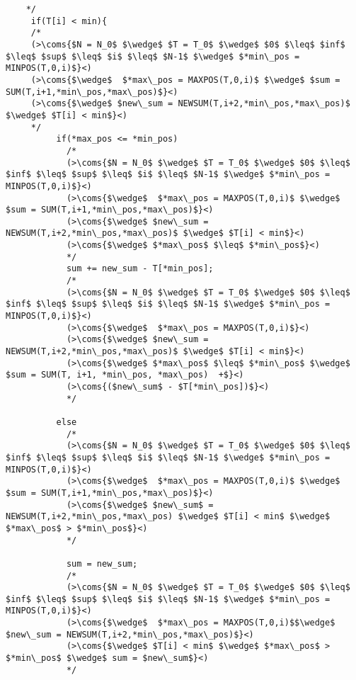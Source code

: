 \begin{lstlisting}
    */
     if(T[i] < min){
     /*
     (>\coms{$N = N_0$ $\wedge$ $T = T_0$ $\wedge$ $0$ $\leq$ $inf$ $\leq$ $sup$ $\leq$ $i$ $\leq$ $N-1$ $\wedge$ $*min\_pos = MINPOS(T,0,i)$}<)
     (>\coms{$\wedge$  $*max\_pos = MAXPOS(T,0,i)$ $\wedge$ $sum = SUM(T,i+1,*min\_pos,*max\_pos)$}<)
     (>\coms{$\wedge$ $new\_sum = NEWSUM(T,i+2,*min\_pos,*max\_pos)$ $\wedge$ $T[i] < min$}<)
     */
          if(*max_pos <= *min_pos)
            /*
            (>\coms{$N = N_0$ $\wedge$ $T = T_0$ $\wedge$ $0$ $\leq$ $inf$ $\leq$ $sup$ $\leq$ $i$ $\leq$ $N-1$ $\wedge$ $*min\_pos = MINPOS(T,0,i)$}<)
            (>\coms{$\wedge$  $*max\_pos = MAXPOS(T,0,i)$ $\wedge$ $sum = SUM(T,i+1,*min\_pos,*max\_pos)$}<)
            (>\coms{$\wedge$ $new\_sum = NEWSUM(T,i+2,*min\_pos,*max\_pos)$ $\wedge$ $T[i] < min$}<) 
            (>\coms{$\wedge$ $*max\_pos$ $\leq$ $*min\_pos$}<)
            */
            sum += new_sum - T[*min_pos];
            /*
            (>\coms{$N = N_0$ $\wedge$ $T = T_0$ $\wedge$ $0$ $\leq$ $inf$ $\leq$ $sup$ $\leq$ $i$ $\leq$ $N-1$ $\wedge$ $*min\_pos = MINPOS(T,0,i)$}<)
            (>\coms{$\wedge$  $*max\_pos = MAXPOS(T,0,i)$}<)
            (>\coms{$\wedge$ $new\_sum = NEWSUM(T,i+2,*min\_pos,*max\_pos)$ $\wedge$ $T[i] < min$}<) 
            (>\coms{$\wedge$ $*max\_pos$ $\leq$ $*min\_pos$ $\wedge$ $sum = SUM(T, i+1, *min\_pos, *max\_pos)  +$}<)
            (>\coms{($new\_sum$ - $T[*min\_pos])$}<)
            */

          else
            /*
            (>\coms{$N = N_0$ $\wedge$ $T = T_0$ $\wedge$ $0$ $\leq$ $inf$ $\leq$ $sup$ $\leq$ $i$ $\leq$ $N-1$ $\wedge$ $*min\_pos = MINPOS(T,0,i)$}<)
            (>\coms{$\wedge$  $*max\_pos = MAXPOS(T,0,i)$ $\wedge$ $sum = SUM(T,i+1,*min\_pos,*max\_pos)$}<)
            (>\coms{$\wedge$ $new\_sum$ = NEWSUM(T,i+2,*min\_pos,*max\_pos) $\wedge$ $T[i] < min$ $\wedge$ $*max\_pos$ > $*min\_pos$}<) 
            */
            
            sum = new_sum;
            /*
            (>\coms{$N = N_0$ $\wedge$ $T = T_0$ $\wedge$ $0$ $\leq$ $inf$ $\leq$ $sup$ $\leq$ $i$ $\leq$ $N-1$ $\wedge$ $*min\_pos = MINPOS(T,0,i)$}<)
            (>\coms{$\wedge$  $*max\_pos = MAXPOS(T,0,i)$$\wedge$ $new\_sum = NEWSUM(T,i+2,*min\_pos,*max\_pos)$}<)
            (>\coms{$\wedge$ $T[i] < min$ $\wedge$ $*max\_pos$ > $*min\_pos$ $\wedge$ sum = $new\_sum$}<) 
            */
    

\end{lstlisting}
